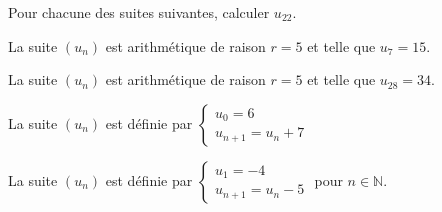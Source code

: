 \documentclass[12pt,a4paper]{article}  %
\begin{document}
Pour chacune des suites suivantes, calculer $u_{22}$.
\begin{enumMet}
    \item La suite $\left(u_{n}\right)$ est arithmétique de raison $r=5$ et telle que $u_{7}=15$.
    \item La suite $\left(u_{n}\right)$ est arithmétique de raison $r=5$ et telle que $u_{28}=34$.
    \item La suite $\left(u_{n}\right)$ est définie par $\left\{\begin{array}{l}u_{0}=6 \\ u_{n+1}=u_{n}+7\end{array}\right.$
    \item {} La suite $\left(u_{n}\right)$ est définie par $\left\{\begin{array}{l}u_{1}=-4 \\ u_{n+1}=u_{n}-5\end{array}\right.$ pour $n \in \mathbb{N}$.
\end{enumMet}
\end{document}
